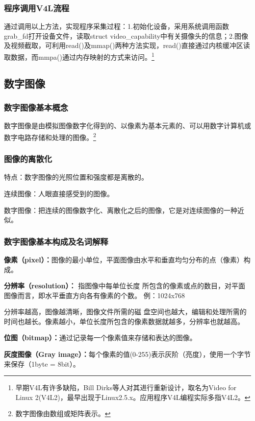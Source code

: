 \documentclass{article}
\begin{document}
\subsubsection{程序调用V4L流程}
通过调用以上方法，实现程序采集过程：1.初始化设备，采用系统调用函数grab\_fd打开设备文件，读取struct video\_capability中有关摄像头的信息；2.图像及视频截取，可利用read()及mmap()两种方法实现，read()直接通过内核缓冲区读取数据，而mmpa()通过内存映射的方式来访问。\footnote{早期V4L有许多缺陷，Bill Dirks等人对其进行重新设计，取名为Video for Linux 2(V4L2)，最早出现于Linux2.5.x。应用程序V4L编程实际多指V4L2。}

\subsection{数字图像}
\subsubsection{数字图像基本概念}
数字图像是由模拟图像数字化得到的、以像素为基本元素的、可以用数字计算机或数字电路存储和处理的图像。\footnote{数字图像由数组或矩阵表示。}



\subsubsection{图像的离散化}

特点：数字图像的光照位置和强度都是离散的。

连续图像：人眼直接感受到的图像。

数字图像：把连续的图像数字化、离散化之后的图像，它是对连续图像的一种近似。

\subsubsection{数字图像基本构成及名词解释}
\textbf{像素（pixel）：}图像的最小单位，平面图像由水平和垂直均匀分布的点（像素）构成。

\textbf{分辨率（resolution）：} 指图像中每单位长度    所包含的像素或点的数目，对平面图像而言，即水平垂直方向各有像素的个数。
例：1024x768

分辨率越高，图像越清晰，图像文件所需的磁    盘空间也越大，编辑和处理所需的时间也越长。像素越小，单位长度所包含的像素数据就越多，分辨率也就越高。


\textbf{位图（bitmap）：}通过记录每一个像素值来存储和表达的图像。

\textbf{灰度图像（Gray image）：}每个像素的值(0-255)表示灰阶（亮度），使用一个字节来保存（1byte = 8bit）。
\end{document}
